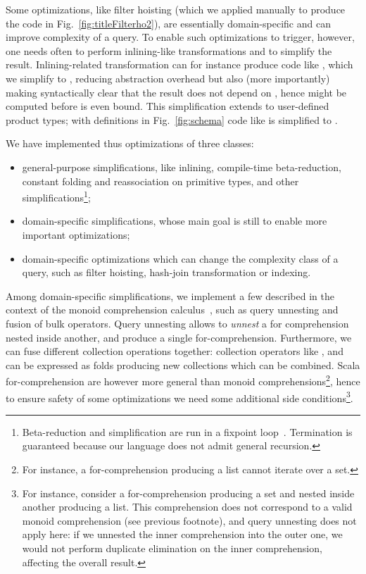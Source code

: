 Some optimizations, like filter hoisting (which we applied manually to produce the code in Fig.~\ref{fig:titleFilterho2}),
are essentially domain-specific and can improve complexity of a query. To enable such optimizations to trigger, however, one needs often to perform inlining-like transformations and to simplify the result. Inlining-related transformation can for instance produce code like , which we simplify to , reducing abstraction overhead but also (more importantly) making syntactically clear that the result does not depend on , hence might be computed before  is even bound. This simplification extends to user-defined product types; with definitions in Fig.~\ref{fig:schema} code like  is simplified to .

We have implemented thus optimizations of three classes:
\begin{itemize}
\item general-purpose simplifications, like inlining, compile-time beta-reduction, constant folding and reassociation on primitive types, and other simplifications\footnote{Beta-reduction and simplification are run in a fixpoint loop~\citep{Peyton-Jones02}. Termination is guaranteed because our language does not admit general recursion.};
\item domain-specific simplifications, whose main goal is still to enable more important optimizations;
\item domain-specific optimizations which can change the complexity class of a query, such as filter hoisting, hash-join transformation or indexing.
\end{itemize}

Among domain-specific simplifications, we implement a few described in the context of the monoid comprehension calculus~\citep{Grust96Translating,Grust99PhD}, such as query unnesting and fusion of bulk operators. Query unnesting allows to \emph{unnest} a for comprehension nested inside another, and produce a single for-comprehension.
Furthermore, we can fuse different collection operations together: collection operators like ,  and  can be expressed as folds producing new collections which can be combined.
Scala for-comprehension are however more general than monoid comprehensions\footnote{For instance, a for-comprehension producing a list cannot iterate over a set.}, hence to ensure safety of some optimizations we need some additional side conditions\footnote{For instance, consider a for-comprehension producing a set and nested inside another producing a list. This comprehension does not correspond to a valid monoid comprehension (see previous footnote), and query unnesting does not apply here: if we unnested the inner comprehension into the outer one, we would not perform duplicate elimination on the inner comprehension, affecting the overall result.}.

